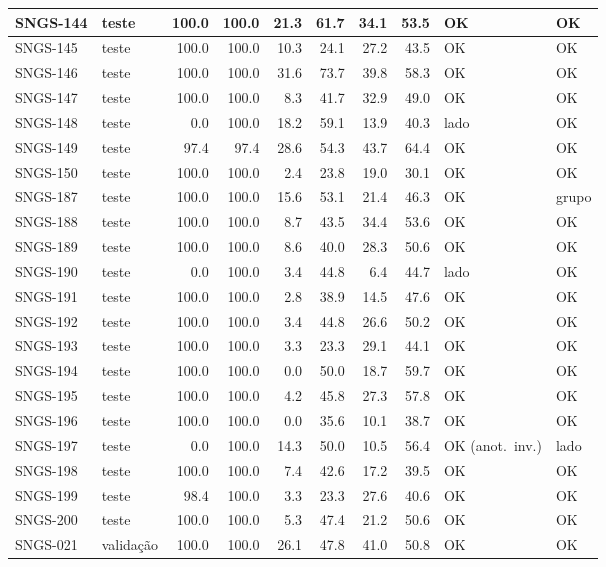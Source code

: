 \begin{small}
\begin{longtable}{|l|l|r|r|r|r|r|r|l|l|}
SNGS-144 & teste & 100.0 & 100.0 & 21.3 & 61.7 & 34.1 & 53.5 & OK & OK \\ \hline
SNGS-145 & teste & 100.0 & 100.0 & 10.3 & 24.1 & 27.2 & 43.5 & OK & OK \\ \hline
SNGS-146 & teste & 100.0 & 100.0 & 31.6 & 73.7 & 39.8 & 58.3 & OK & OK \\ \hline
SNGS-147 & teste & 100.0 & 100.0 & 8.3 & 41.7 & 32.9 & 49.0 & OK & OK \\ \hline
SNGS-148 & teste & 0.0 & 100.0 & 18.2 & 59.1 & 13.9 & 40.3 & lado & OK \\ \hline
SNGS-149 & teste & 97.4 & 97.4 & 28.6 & 54.3 & 43.7 & 64.4 & OK & OK \\ \hline
SNGS-150 & teste & 100.0 & 100.0 & 2.4 & 23.8 & 19.0 & 30.1 & OK & OK \\ \hline
SNGS-187 & teste & 100.0 & 100.0 & 15.6 & 53.1 & 21.4 & 46.3 & OK & grupo \\ \hline
SNGS-188 & teste & 100.0 & 100.0 & 8.7 & 43.5 & 34.4 & 53.6 & OK & OK \\ \hline
SNGS-189 & teste & 100.0 & 100.0 & 8.6 & 40.0 & 28.3 & 50.6 & OK & OK \\ \hline
SNGS-190 & teste & 0.0 & 100.0 & 3.4 & 44.8 & 6.4 & 44.7 & lado & OK \\ \hline
SNGS-191 & teste & 100.0 & 100.0 & 2.8 & 38.9 & 14.5 & 47.6 & OK & OK \\ \hline
SNGS-192 & teste & 100.0 & 100.0 & 3.4 & 44.8 & 26.6 & 50.2 & OK & OK \\ \hline
SNGS-193 & teste & 100.0 & 100.0 & 3.3 & 23.3 & 29.1 & 44.1 & OK & OK \\ \hline
SNGS-194 & teste & 100.0 & 100.0 & 0.0 & 50.0 & 18.7 & 59.7 & OK & OK \\ \hline
SNGS-195 & teste & 100.0 & 100.0 & 4.2 & 45.8 & 27.3 & 57.8 & OK & OK \\ \hline
SNGS-196 & teste & 100.0 & 100.0 & 0.0 & 35.6 & 10.1 & 38.7 & OK & OK \\ \hline
SNGS-197 & teste & 0.0 & 100.0 & 14.3 & 50.0 & 10.5 & 56.4 & OK (anot.\ inv.) & lado \\ \hline
SNGS-198 & teste & 100.0 & 100.0 & 7.4 & 42.6 & 17.2 & 39.5 & OK & OK \\ \hline
SNGS-199 & teste & 98.4 & 100.0 & 3.3 & 23.3 & 27.6 & 40.6 & OK & OK \\ \hline
SNGS-200 & teste & 100.0 & 100.0 & 5.3 & 47.4 & 21.2 & 50.6 & OK & OK \\ \hline
SNGS-021 & validação & 100.0 & 100.0 & 26.1 & 47.8 & 41.0 & 50.8 & OK & OK \\ \hline

\end{longtable}
\end{small}
